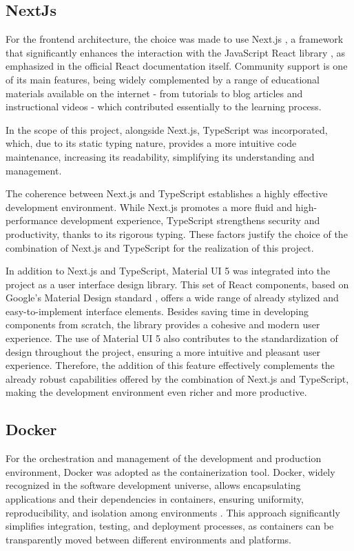 \subsection{NextJs}
For the frontend architecture, the choice was made to use Next.js \cite{nextjsDocs}, a framework that significantly enhances the interaction with the JavaScript React library \cite{reactDocs}, as emphasized in the official React documentation itself. Community support is one of its main features, being widely complemented by a range of educational materials available on the internet - from tutorials to blog articles and instructional videos - which contributed essentially to the learning process.

In the scope of this project, alongside Next.js, TypeScript \cite{typescriptLang} was incorporated, which, due to its static typing nature, provides a more intuitive code maintenance, increasing its readability, simplifying its understanding and management.

The coherence between Next.js and TypeScript establishes a highly effective development environment. While Next.js promotes a more fluid and high-performance development experience, TypeScript strengthens security and productivity, thanks to its rigorous typing. These factors justify the choice of the combination of Next.js and TypeScript for the realization of this project.

In addition to Next.js and TypeScript, Material UI 5 \cite{muiDocs} was integrated into the project as a user interface design library. This set of React components, based on Google's Material Design standard \cite{m3Docs}, offers a wide range of already stylized and easy-to-implement interface elements. Besides saving time in developing components from scratch, the library provides a cohesive and modern user experience. The use of Material UI 5 also contributes to the standardization of design throughout the project, ensuring a more intuitive and pleasant user experience. Therefore, the addition of this feature effectively complements the already robust capabilities offered by the combination of Next.js and TypeScript, making the development environment even richer and more productive.

\subsection{Docker}
For the orchestration and management of the development and production environment, Docker \cite{dockerDocs} was adopted as the containerization tool. Docker, widely recognized in the software development universe, allows encapsulating applications and their dependencies in containers, ensuring uniformity, reproducibility, and isolation among environments \cite{dockerOverview}. This approach significantly simplifies integration, testing, and deployment processes, as containers can be transparently moved between different environments and platforms.

